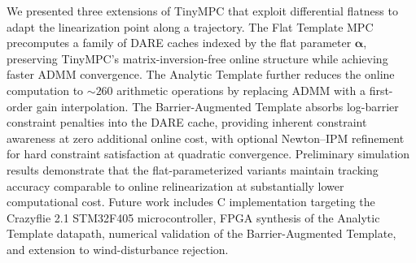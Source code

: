 \documentclass[letterpaper, 10pt, conference]{IEEEtran}
\newcommand{\balpha}{\bm{\alpha}}
\begin{document}
We presented three extensions of TinyMPC that exploit differential
flatness to adapt the linearization point along a trajectory.
The Flat Template MPC precomputes a family of DARE caches indexed
by the flat parameter $\balpha$, preserving TinyMPC's
matrix-inversion-free online structure while achieving
faster ADMM convergence.
The Analytic Template further reduces the online computation
to ${\sim}260$ arithmetic operations by replacing ADMM
with a first-order gain interpolation.
The Barrier-Augmented Template absorbs log-barrier constraint
penalties into the DARE cache, providing inherent constraint
awareness at zero additional online cost, with optional
Newton--IPM refinement for hard constraint satisfaction
at quadratic convergence.
Preliminary simulation results demonstrate that
the flat-parameterized variants
maintain tracking accuracy comparable to online relinearization
at substantially lower computational cost.
Future work includes C implementation targeting the
Crazyflie 2.1 STM32F405 microcontroller,
FPGA synthesis of the Analytic Template datapath,
numerical validation of the Barrier-Augmented Template,
and extension to wind-disturbance rejection.
\end{document}
